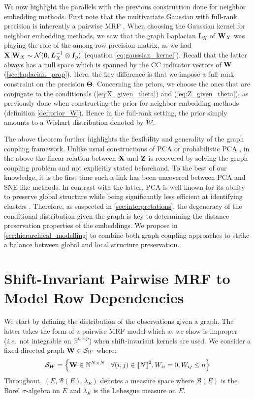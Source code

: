 We now highlight the parallels with the previous construction done for neighbor embedding methods. First note that the multivariate Gaussian with full-rank precision is inherently a pairwise MRF \citep{rue2005gaussian}. When choosing the Gaussian kernel for neighbor embedding methods, we saw that the graph Laplacian $\bm{L}_{X}$ of ${\mathbf{W}}_{X}$ was playing the role of the among-row precision matrix, as we had $\mathbf{X} | {\mathbf{W}}_{X} \sim \mathcal{N}(\bm{0}, \bm{L}_{X}^{-1} \otimes \bm{I}_p)$ (equation \ref{eq:gaussian_kernel}). Recall that the latter always has a null space which is spanned by the CC indicator vectors of ${\mathbf{W}}$ (\cref{sec:laplacian_prop}). Here, the key difference is that we impose a full-rank constraint on the precision $\bm{\Theta}$. Concerning the priors, we choose the ones that are conjugate to the conditionals (\ref{eq:X_given_theta}) and (\ref{eq:Z_given_theta}), as previously done when constructing the prior for neighbor embedding methods (definition \ref{def:prior_W}). Hence in the full-rank setting, the prior simply amounts to a Wishart distribution denoted by $\mathcal{W}$.

The above theorem further highlights the flexibility and generality of the graph coupling framework. Unlike usual constructions of PCA or probabilistic PCA \citep{tipping1999probabilistic}, in the above the linear relation between $\mathbf{X}$ and $\mathbf{Z}$ is recovered by solving the graph coupling problem and not explicitly stated beforehand. To the best of our knowledge, it is the first time such a link has been uncovered between PCA and SNE-like methods. In contrast with the latter, PCA is well-known for its ability to preserve global structure while being significantly less efficient at identifying clusters \citep{anowar2021conceptual}. Therefore, as suspected in \cref{sec:interpretations}, the degeneracy of the conditional distribution given the graph is key to determining the distance preservation properties of the embeddings. We propose in \cref{sec:hierarchical_modelling} to combine both graph coupling approaches to strike a balance between global and local structure preservation.

\section {Shift-Invariant Pairwise MRF to Model Row Dependencies} \label{sec:graph_structure}

We start by defining the distribution of the observations given a graph. The latter takes the form of a pairwise MRF model which as we show is improper (\textit{i.e.}\ not integrable on $\mathbb{R}^{n \times p}$) when shift-invariant kernels are used. We consider a fixed directed graph ${\mathbf{W}} \in \mathcal{S}_{W}$ where:
$$\mathcal{S}_{W} = \left\{{\mathbf{W}} \in \mathbb{N}^{N \times N} \mid \forall (i,j) \in {[\![N]\!]}^2, W_{ii}=0, W_{ij} \leq n \right\}$$
Throughout, $(E, \mathcal{B}(E), \lambda_E)$ denotes a measure space where $\mathcal{B}(E)$ is the Borel $\sigma$-algebra on $E$ and $\lambda_E$ is the Lebesgue measure on $E$.

